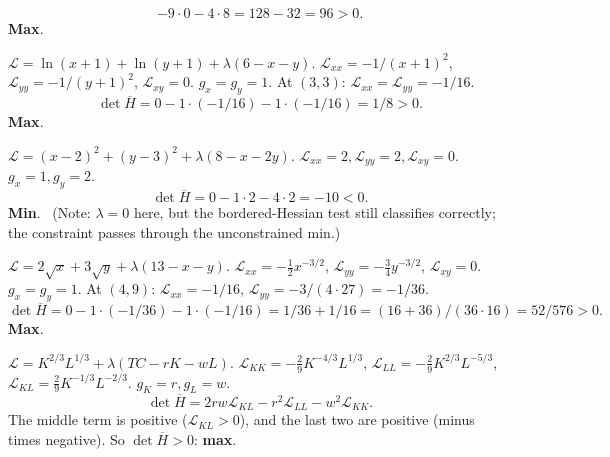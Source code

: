 \begin{solutions}
\[        - 9 \cdot 0 - 4 \cdot 8 = 128 - 32 = 96 > 0.\] \textbf{Max}.
        \checkmark
  \item $\mathcal{L} = \ln(x + 1) + \ln(y + 1) + \lambda(6 - x - y)$.
        $\mathcal{L}_{xx} = -1/(x + 1)^2$,
        $\mathcal{L}_{yy} = -1/(y + 1)^2$, $\mathcal{L}_{xy} = 0$.
        $g_x = g_y = 1$. At $(3, 3)$:
        $\mathcal{L}_{xx} = \mathcal{L}_{yy} = -1/16$.
        \[\det \overline{H} = 0 - 1 \cdot (-1/16) - 1 \cdot (-1/16)
        = 1/8 > 0.\] \textbf{Max}. \checkmark
  \item $\mathcal{L} = (x - 2)^2 + (y - 3)^2 + \lambda(8 - x - 2 y)$.
        $\mathcal{L}_{xx} = 2, \mathcal{L}_{yy} = 2,
        \mathcal{L}_{xy} = 0$. $g_x = 1, g_y = 2$.
        \[\det \overline{H} = 0 - 1 \cdot 2 - 4 \cdot 2 = -10 < 0.\]
        \textbf{Min}. \checkmark\ (Note: $\lambda = 0$ here, but the
        bordered-Hessian test still classifies correctly; the constraint
        passes through the unconstrained min.)
  \item $\mathcal{L} = 2 \sqrt{x} + 3 \sqrt{y} + \lambda(13 - x - y)$.
        $\mathcal{L}_{xx} = -\tfrac{1}{2} x^{-3/2}$,
        $\mathcal{L}_{yy} = -\tfrac{3}{4} y^{-3/2}$,
        $\mathcal{L}_{xy} = 0$. $g_x = g_y = 1$. At $(4, 9)$:
        $\mathcal{L}_{xx} = -1/16$,
        $\mathcal{L}_{yy} = -3/(4 \cdot 27) = -1/36$.
        \[\det \overline{H} = 0 - 1 \cdot (-1/36) - 1 \cdot (-1/16)
        = 1/36 + 1/16 = (16 + 36)/(36 \cdot 16) = 52/576 > 0.\]
        \textbf{Max}. \checkmark
  \item $\mathcal{L} = K^{2/3} L^{1/3} + \lambda(TC - r K - w L)$.
        $\mathcal{L}_{KK} = -\tfrac{2}{9} K^{-4/3} L^{1/3}$,
        $\mathcal{L}_{LL} = -\tfrac{2}{9} K^{2/3} L^{-5/3}$,
        $\mathcal{L}_{KL} = \tfrac{2}{9} K^{-1/3} L^{-2/3}$.
        $g_K = r, g_L = w$.
        \[\det \overline{H} = 2 r w \mathcal{L}_{KL}
        - r^2 \mathcal{L}_{LL} - w^2 \mathcal{L}_{KK}.\]
        The middle term is positive ($\mathcal{L}_{KL} > 0$), and the
        last two are positive (minus times negative). So
        $\det \overline{H} > 0$: \textbf{max}. \checkmark


\end{solutions}

